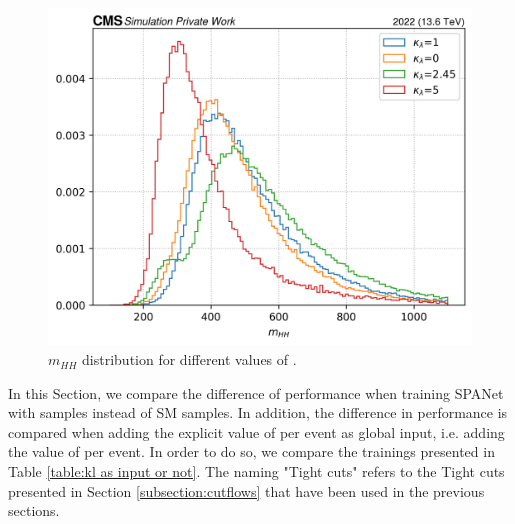 \begin{figure}[hbt]
    \centering
    \includegraphics[width=0.5\linewidth]{Images/6.Improving/kappa lambda/mhh distribution for diff kl.png}
    \caption{$m_{HH}$ distribution for different values of \kl.}
    \label{fig: mhh dist}
\end{figure}


\vspace{0.2cm}

In this Section, we compare the difference of performance when training SPANet with \kl samples instead of SM samples. In addition, the difference in performance is compared when adding the explicit value of \kl per event as global input, i.e. adding the value of \kl per event. In order to do so, we compare the trainings presented in Table \ref{table:kl as input or not}. The naming "Tight cuts" refers to the Tight cuts presented in Section \ref{subsection:cutflows} that have been used in the previous sections. 

